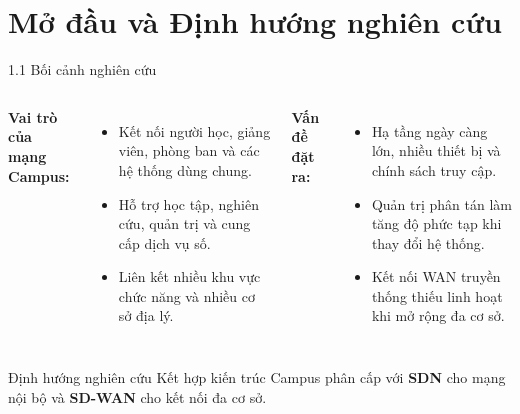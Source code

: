 
\section{Mở đầu và Định hướng nghiên cứu}

\begin{frame}{1.1 Bối cảnh nghiên cứu}
    \small
    \begin{columns}[T]
        \textbf{Vai trò của mạng Campus:}
        \begin{itemize}
            \item Kết nối người học, giảng viên, phòng ban và các hệ thống dùng chung.
            \item Hỗ trợ học tập, nghiên cứu, quản trị và cung cấp dịch vụ số.
            \item Liên kết nhiều khu vực chức năng và nhiều cơ sở địa lý.
        \end{itemize}

        \textbf{Vấn đề đặt ra:}
        \begin{itemize}
            \item Hạ tầng ngày càng lớn, nhiều thiết bị và chính sách truy cập.
            \item Quản trị phân tán làm tăng độ phức tạp khi thay đổi hệ thống.
            \item Kết nối WAN truyền thống thiếu linh hoạt khi mở rộng đa cơ sở.
        \end{itemize}
    \end{columns}
    \vspace{0.2cm}
    \begin{block}{Định hướng nghiên cứu}
        Kết hợp kiến trúc Campus phân cấp với \textbf{SDN} cho mạng nội bộ và \textbf{SD-WAN} cho kết nối đa cơ sở.
    \end{block}
\end{frame}

